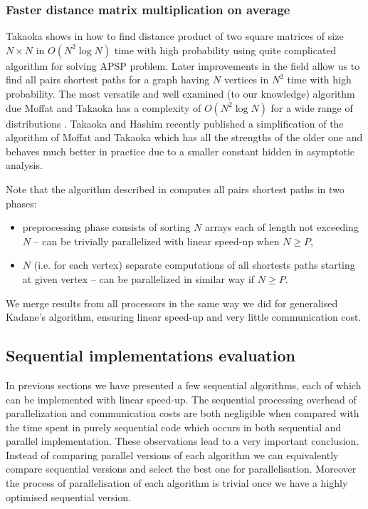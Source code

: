 \subsubsection*{Faster distance matrix multiplication on average}

Takaoka shows in \cite{TakaokaMSA} how to find distance product of two square matrices of size $N \times N$ in $O(N^2 \log{N})$ time with high probability using quite complicated algorithm for solving APSP problem.
Later improvements in the field allow us to find all pairs shortest paths for a graph having $N$ vertices in $N^2$ time with high probability.
The most versatile and well examined (to our knowledge) algorithm due Moffat and Takaoka has a complexity of $O(N^2 \log{N})$ for a wide range of distributions \cite{MoffatTakaoka}.
Takaoka and Hashim recently published \cite{TakaokaHashim} a simplification of the algorithm of Moffat and Takaoka which has all the strengths of the older one and behaves much better in practice due to a smaller constant hidden in asymptotic analysis.

Note that the algorithm described in \cite{TakaokaHashim} computes all pairs shortest paths in two phases:
\begin{itemize}
    \item preprocessing phase consists of sorting $N$ arrays each of length not exceeding $N$ -- can be trivially parallelized with linear speed-up when $N \geq P$,
    \item $N$ (i.e. for each vertex) separate computations of all shortests paths starting at given vertex -- can be parallelized in similar way if $N \geq P$.
\end{itemize}
We merge results from all processors in the same way we did for generalised Kadane's algorithm, ensuring linear speed-up and very little communication cost.

\subsection*{Sequential implementations evaluation}

In previous sections we have presented a few sequential algorithms, each of which can be implemented with linear speed-up.
The sequential processing overhead of parallelization and communication costs are both negligible when compared with the time spent in purely sequential code which occurs in both sequential and parallel implementation.
These observations lead to a very important conclusion.
Instead of comparing parallel versions of each algorithm we can equivalently compare sequential versions and select the best one for parallelisation.
Moreover the process of parallelisation of each algorithm is trivial once we have a highly optimised sequential version.

